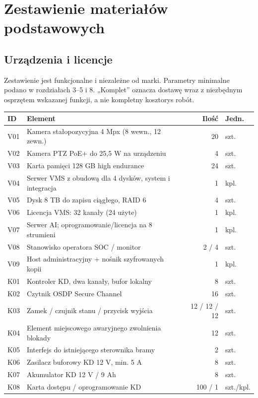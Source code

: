 \section{Zestawienie materiałów podstawowych}
\subsection{Urządzenia i licencje}
Zestawienie jest funkcjonalne i niezależne od marki. Parametry minimalne podano w rozdziałach 3--5 i 8. „Komplet” oznacza dostawę wraz z niezbędnym osprzętem wskazanej funkcji, a nie kompletny kosztorys robót.\par\smallskip
\begingroup\small
\begin{tabularx}{\linewidth}{@{}P{11mm}Y r P{15mm}@{}}
\toprule\textbf{ID} & \textbf{Element} & \textbf{Ilość} & \textbf{Jedn.}\\\midrule
V01 & Kamera stałopozycyjna 4 Mpx (8 wewn., 12 zewn.) & 20 & szt.\\
V02 & Kamera PTZ PoE+ do 25,5 W na urządzeniu & 4 & szt.\\
V03 & Karta pamięci 128 GB high endurance & 24 & szt.\\
V04 & Serwer VMS z obudową dla 4 dysków, system i integracja & 1 & kpl.\\
V05 & Dysk 8 TB do zapisu ciągłego, RAID 6 & 4 & szt.\\
V06 & Licencja VMS: 32 kanały (24 użyte) & 1 & kpl.\\
V07 & Serwer AI; oprogramowanie/licencja na 8 strumieni & 1 & kpl.\\
V08 & Stanowisko operatora SOC / monitor & 2 / 4 & szt.\\
V09 & Host administracyjny + nośnik szyfrowanych kopii & 1 & kpl.\\\midrule
K01 & Kontroler KD, dwa kanały, bufor lokalny & 8 & szt.\\
K02 & Czytnik OSDP Secure Channel & 16 & szt.\\
K03 & Zamek / czujnik stanu / przycisk wyjścia & 12 / 12 / 12 & szt.\\
K04 & Element miejscowego awaryjnego zwolnienia blokady & 12 & szt.\\
K05 & Interfejs do istniejącego sterownika bramy & 2 & szt.\\
K06 & Zasilacz buforowy KD 12 V, min. 5 A & 8 & szt.\\
K07 & Akumulator KD 12 V / 9 Ah & 8 & szt.\\
K08 & Karta dostępu / oprogramowanie KD & 100 / 1 & szt./kpl.\\\midrule

\end{tabularx}
